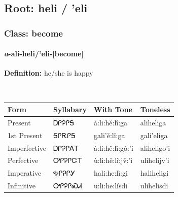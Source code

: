 \needspace{4in}
\subsection*{Root: heli / 'eli}
\nopagebreak
{}
\needspace{3in}
\subsubsection*{Class: become}
\nopagebreak
\needspace{2in}
\paragraph*{\textit{a}{-}ali{-}\textbf{heli/'eli}{-}[become]}
\nopagebreak
\textbf{Definition: } he/she is happy
\\[0.5em]
\begin{tabularx}{\textwidth}{l X X X}%
\toprule%
\textbf{Form}&\textbf{Syllabary}&\textbf{With Tone}&\textbf{Toneless}\\%
\midrule%
Present&ᎠᎵᎮᎵᎦ&à:li:hě:lî:ga&aliheliga\\%
1st Present&ᎦᎵᎡᎵᎦ&gali’ě:lî:ga&gali’eliga\\%
Imperfective&ᎠᎵᎮᎵᎪᎢ&à:li:hě:lî:gó:’i&aliheligo’i\\%
Perfective&ᎤᎵᎮᎵᏨᎢ&ù:li:hě:lî:jv̌:’i&ulihelijv’i\\%
Imperative&ᎭᎵᎮᎵᎩ&hali:he:lì:gi&haliheligi\\%
Infinitive&ᎤᎵᎮᎵᏍᏗ&u:li:he:lísdi&ulihelisdi\\%
\bottomrule%
\end{tabularx}
\\[1em]